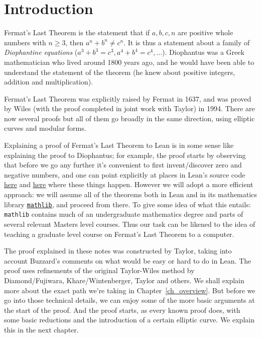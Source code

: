 \chapter{Introduction}

Fermat's Last Theorem is the statement that if $a,b,c,n$ are positive whole numbers with $n\geq 3$, then $a^n+b^n\not=c^n$. It is thus a statement about a family of \emph{Diophantine equations} ($a^3+b^3=c^3, a^4+b^4=c^4,\ldots$). Diophantus was a Greek mathematician who lived around 1800 years ago, and he would have been able to understand the statement of the theorem (he knew about positive integers, addition and multiplication).

Fermat's Last Theorem was explicitly raised by Fermat in 1637, and was proved by Wiles (with the proof completed in joint work with Taylor) in 1994. There are now several proofs but all of them go broadly in the same direction, using elliptic curves and modular forms.

Explaining a proof of Fermat's Last Theorem to Lean is in some sense like explaining the proof to Diophantus; for example, the proof starts by observing that before we go any further it's convenient to first invent/discover zero and negative numbers, and one can point explicitly at places in Lean's source code \href{https://github.com/leanprover/lean4/blob/260eaebf4e804c9ac1319532970544a4e157c336/src/Init/Prelude.lean#L1049}{here} and \href{https://github.com/leanprover/lean4/blob/260eaebf4e804c9ac1319532970544a4e157c336/src/Init/Data/Int/Basic.lean#L45}{here} where these things happen. However we will adopt a more efficient approach: we will assume all of the theorems both in Lean and in its mathematics library \href{https://github.com/leanprover-community/mathlib4}{\tt mathlib}, and proceed from there. To give some idea of what this entails: {\tt mathlib} contains much of an undergraduate mathematics degree and parts of several relevant Masters level courses. Thus our task can be likened to the idea of teaching a graduate level course on Fermat's Last Theorem to a computer.

The proof explained in these notes was constructed by Taylor, taking into account Buzzard's comments on what would be easy or hard to do in Lean. The proof uses refinements of the original Taylor-Wiles method by Diamond/Fujiwara, Khare/Wintenberger, Taylor and others. We shall explain more about the exact path we're taking in Chapter~\ref{ch_overview}. But before we go into those technical details, we can enjoy some of the more basic arguments at the start of the proof. And the proof starts, as every known proof does, with some basic reductions and the introduction of a certain elliptic curve. We explain this in the next chapter.
